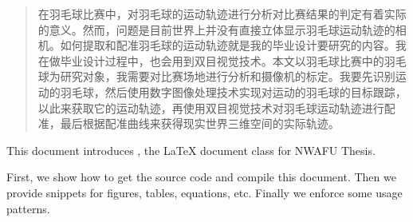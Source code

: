 
\begin{abstract}
在羽毛球比赛中，对羽毛球的运动轨迹进行分析对比赛结果的判定有着实际的意义。然而，问题是目前世界上并没有直接立体显示羽毛球运动轨迹的相机。如何提取和配准羽毛球的运动轨迹就是我的毕业设计要研究的内容。我在做毕业设计过程中，也会用到双目视觉技术。本文以羽毛球比赛中的羽毛球为研究对象，我需要对比赛场地进行分析和摄像机的标定。我要先识别运动的羽毛球，然后使用数字图像处理技术实现对运动的羽毛球的目标跟踪，以此来获取它的运动轨迹，再使用双目视觉技术对羽毛球运动轨迹进行配准，最后根据配准曲线来获得现实世界三维空间的实际轨迹。

\end{abstract}

\begin{abstractEn}
This document introduces \nwafuthesis, the \LaTeX{} document class for NWAFU Thesis.

First, we show how to get the source code and compile this document.
Then we provide snippets for figures, tables, equations, etc.
Finally we enforce some usage patterns.
\end{abstractEn}

